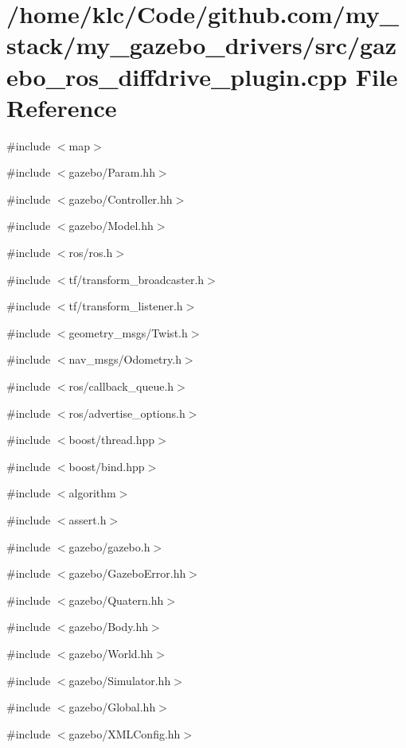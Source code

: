 \section{/home/klc/Code/github.com/my\_\-stack/my\_\-gazebo\_\-drivers/src/gazebo\_\-ros\_\-diffdrive\_\-plugin.cpp File Reference}
\label{gazebo__ros__diffdrive__plugin_8cpp}
{\ttfamily \#include $<$map$>$}\par
{\ttfamily \#include $<$gazebo/Param.hh$>$}\par
{\ttfamily \#include $<$gazebo/Controller.hh$>$}\par
{\ttfamily \#include $<$gazebo/Model.hh$>$}\par
{\ttfamily \#include $<$ros/ros.h$>$}\par
{\ttfamily \#include $<$tf/transform\_\-broadcaster.h$>$}\par
{\ttfamily \#include $<$tf/transform\_\-listener.h$>$}\par
{\ttfamily \#include $<$geometry\_\-msgs/Twist.h$>$}\par
{\ttfamily \#include $<$nav\_\-msgs/Odometry.h$>$}\par
{\ttfamily \#include $<$ros/callback\_\-queue.h$>$}\par
{\ttfamily \#include $<$ros/advertise\_\-options.h$>$}\par
{\ttfamily \#include $<$boost/thread.hpp$>$}\par
{\ttfamily \#include $<$boost/bind.hpp$>$}\par
{\ttfamily \#include $<$algorithm$>$}\par
{\ttfamily \#include $<$assert.h$>$}\par
{\ttfamily \#include $<$gazebo/gazebo.h$>$}\par
{\ttfamily \#include $<$gazebo/GazeboError.hh$>$}\par
{\ttfamily \#include $<$gazebo/Quatern.hh$>$}\par
{\ttfamily \#include $<$gazebo/Body.hh$>$}\par
{\ttfamily \#include $<$gazebo/World.hh$>$}\par
{\ttfamily \#include $<$gazebo/Simulator.hh$>$}\par
{\ttfamily \#include $<$gazebo/Global.hh$>$}\par
{\ttfamily \#include $<$gazebo/XMLConfig.hh$>$}\par
